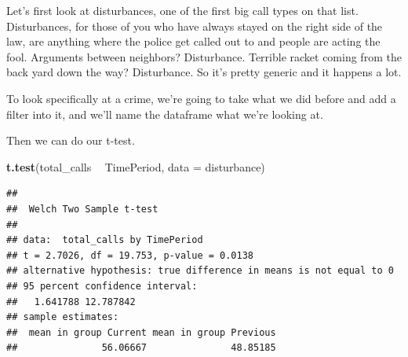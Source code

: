 \documentclass[]{book}
\newenvironment{Shaded}{\begin{snugshade}}{\end{snugshade}}
\newcommand{\DataTypeTok}[1]{\textcolor[rgb]{0.13,0.29,0.53}{#1}}
\newcommand{\DecValTok}[1]{\textcolor[rgb]{0.00,0.00,0.81}{#1}}
\newcommand{\KeywordTok}[1]{\textcolor[rgb]{0.13,0.29,0.53}{\textbf{#1}}}
\newcommand{\NormalTok}[1]{#1}
\newcommand{\OperatorTok}[1]{\textcolor[rgb]{0.81,0.36,0.00}{\textbf{#1}}}
\newcommand{\StringTok}[1]{\textcolor[rgb]{0.31,0.60,0.02}{#1}}
\begin{document}
Let's first look at disturbances, one of the first big call types on that list. Disturbances, for those of you who have always stayed on the right side of the law, are anything where the police get called out to and people are acting the fool. Arguments between neighbors? Disturbance. Terrible racket coming from the back yard down the way? Disturbance. So it's pretty generic and it happens a lot.

To look specifically at a crime, we're going to take what we did before and add a filter into it, and we'll name the dataframe what we're looking at.

\begin{Shaded}
\end{Shaded}

Then we can do our t-test.

\begin{Shaded}
\begin{Highlighting}[]
\KeywordTok{t.test}\NormalTok{(total_calls }\OperatorTok{~}\StringTok{ }\NormalTok{TimePeriod, }\DataTypeTok{data =}\NormalTok{ disturbance)}
\end{Highlighting}
\end{Shaded}

\begin{verbatim}
## 
##  Welch Two Sample t-test
## 
## data:  total_calls by TimePeriod
## t = 2.7026, df = 19.753, p-value = 0.0138
## alternative hypothesis: true difference in means is not equal to 0
## 95 percent confidence interval:
##   1.641788 12.787842
## sample estimates:
##  mean in group Current mean in group Previous 
##               56.06667               48.85185
\end{verbatim}
\end{document}

